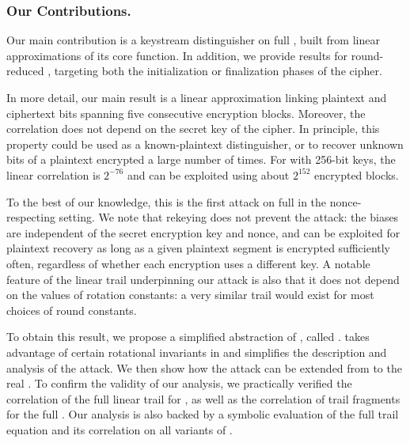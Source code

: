 \subsubsection*{Our Contributions.}
Our main contribution is a keystream distinguisher on full \MORUS[1280], built from linear approximations of its core \StateUpdate{} function.
In addition, we provide results for round-reduced \MORUS, targeting both the initialization or finalization phases of the cipher.

In more detail, our main result is a linear approximation \cite{eurocryptMatsui93,eurocryptMatsuiY92} linking plaintext and ciphertext bits spanning five consecutive encryption blocks.
Moreover, the correlation does not depend on the secret key of the cipher.
In principle, this property could be used as a known-plaintext distinguisher, or to recover unknown bits of a plaintext encrypted a large number of times.
For \MORUS[1280] with 256-bit keys, the linear correlation is $2^{-76}$
and can be exploited using about $2^{152}$ encrypted blocks.

To the best of our knowledge, this is the first attack on full \MORUS in the nonce-respecting setting.
We note that rekeying does not prevent the attack: the biases are independent of the secret encryption key and nonce, and can be exploited for plaintext recovery as long as a given plaintext segment is encrypted sufficiently often, regardless of whether each encryption uses a different key.
A notable feature of the linear trail underpinning our attack is also that it does not depend on the values of rotation constants: a very similar trail would exist for most choices of round constants.

To obtain this result, we propose a simplified abstraction of \MORUS, called \MiniMORUS. \MiniMORUS takes advantage of certain rotational invariants in \MORUS and simplifies the description and analysis of the attack. We then show how the attack can be extended from \MiniMORUS to the real \MORUS.
To confirm the validity of our analysis,
we practically verified the correlation of the full linear trail for \MiniMORUS, as well as the correlation of trail fragments for the full \MORUS.
Our analysis is also backed by a symbolic evaluation of the full trail equation and its correlation on all variants of \MORUS.

